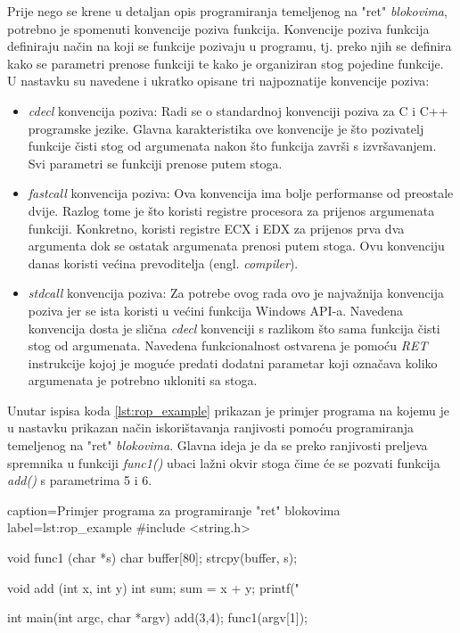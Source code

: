 \documentclass[times, utf8, diplomski, numeric]{fer}
\begin{document}
Prije nego se krene u detaljan opis programiranja temeljenog na
"ret" \emph{blokovima}, potrebno  je spomenuti konvencije poziva
funkcija. Konvencije poziva funkcija definiraju način na koji se
funkcije pozivaju u programu, tj. preko njih se definira kako se
parametri prenose funkciji te kako je organiziran stog pojedine
funkcije. U nastavku su navedene i ukratko opisane tri
najpoznatije konvencije poziva:

\begin{itemize}

\item \emph{cdecl} konvencija poziva: Radi se o standardnoj
konvenciji poziva za C i C++ programske jezike. Glavna
karakteristika ove konvencije je što pozivatelj funkcije čisti
stog od argumenata nakon što funkcija završi s izvršavanjem. Svi
parametri se funkciji prenose putem stoga.

\item \emph{fastcall} konvencija poziva: Ova konvencija ima bolje
performanse od preostale dvije. Razlog tome je što koristi
registre procesora za prijenos argumenata funkciji. Konkretno,
koristi registre ECX i EDX za prijenos prva dva argumenta dok se
ostatak argumenata prenosi putem stoga. Ovu konvenciju danas
koristi većina prevoditelja (engl. \emph{compiler}).

\item \emph{stdcall} konvencija poziva: Za potrebe ovog rada ovo
je najvažnija konvencija poziva jer se ista koristi u većini
funkcija Windows API-a. Navedena konvencija dosta je slična
\emph{cdecl} konvenciji s razlikom što sama funkcija čisti stog
od argumenata. Navedena funkcionalnost ostvarena je pomoću
\emph{RET} instrukcije kojoj je moguće predati dodatni parametar
koji označava koliko argumenata je potrebno ukloniti sa stoga.
\end{itemize}

Unutar ispisa koda \ref{lst:rop_example} prikazan je primjer
programa na kojemu je u nastavku prikazan način iskorištavanja
ranjivosti pomoću programiranja temeljenog na "ret" \emph{blokovima}.
Glavna ideja je da se preko ranjivosti preljeva spremnika u
funkciji \emph{func1()} ubaci lažni okvir stoga čime će se
pozvati funkcija \emph{add()} s parametrima 5 i 6.
 
\begin{ispis} {caption=Primjer programa za programiranje "ret" blokovima} {label=lst:rop_example}
#include <string.h>
 
void func1 (char *s) { char buffer[80]; strcpy(buffer, s); }

void add (int x, int y)
{
	int sum;
	sum = x + y;
	printf("%
}

int main(int argc, char *argv)
{
	add(3,4);
	func1(argv[1]);
}
\end{ispis}
\end{document}
